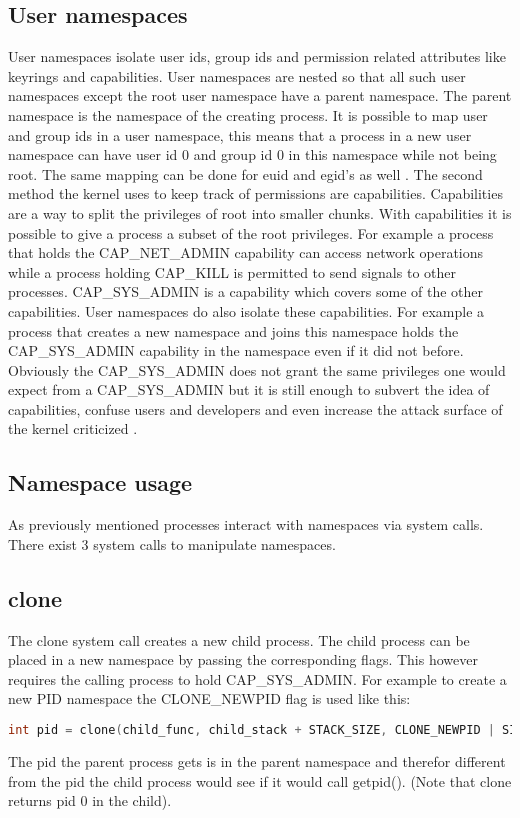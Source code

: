 \documentclass[10pt,twocolumn,a4paper]{article}
\begin{document}
\subsection{User namespaces}
User namespaces isolate user ids, group ids and permission related attributes like keyrings and
capabilities. User namespaces are nested so that all such user namespaces except the root user namespace
have a parent namespace. The parent namespace is the namespace of the creating process. 
It is possible to map user and group ids in a user namespace, this means that a process in a new user
namespace can have user id 0 and group id 0 in this namespace while not being root. The same mapping
can be done for euid and egid's as well \cite{18}. The second method the kernel uses to keep track
of permissions are capabilities. Capabilities are a way to split the privileges of root into smaller
chunks. With capabilities it is possible to give a process a subset of the root
privileges. For example a process that holds the CAP\_NET\_ADMIN capability can access network
operations while a process holding CAP\_KILL is permitted to send signals to other
processes\cite{19}. CAP\_SYS\_ADMIN is a capability which covers some of the
other capabilities. 
User namespaces do also isolate these capabilities. For example a process that creates a new
namespace and joins this namespace holds the CAP\_SYS\_ADMIN capability in the namespace even if it did not before. Obviously the CAP\_SYS\_ADMIN does not grant the same privileges one would expect from
a  CAP\_SYS\_ADMIN but it is still enough to subvert the idea of capabilities, confuse users and
developers and even increase the attack surface of the kernel criticized \cite{20}. 

\subsection{Namespace usage}
As previously mentioned processes interact with namespaces via system calls. There exist 3 system calls
to manipulate namespaces. 
\subsection{ clone}
The clone system call creates a new child process. The child process can be placed in a new
namespace by passing the corresponding flags. This however requires the calling process to hold
CAP\_SYS\_ADMIN. For example to create a new PID namespace the CLONE\_NEWPID flag is used like this:
\begin{lstlisting}[language=C]
    int pid = clone(child_func, child_stack + STACK_SIZE, CLONE_NEWPID | SIGCHLD, NULL);
\end{lstlisting}
The pid the parent process gets is in the parent namespace and therefor different from the pid the
child process would see if it would call getpid(). (Note that clone returns pid 0 in the
child)\cite{22}.
\end{document}
